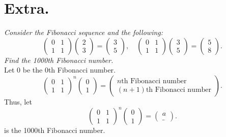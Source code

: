 \documentclass[12pt]{article}
\begin{document}
\section{Extra.}
\textit{Consider the Fibonacci sequence and the following:}
\begin{equation*}
	\begin{pmatrix} 0 & 1 \\ 1 & 1 \end{pmatrix}
	\begin{pmatrix} 2 \\ 3 \end{pmatrix}
	=
	\begin{pmatrix} 3 \\ 5 \end{pmatrix}
	, \quad
	\begin{pmatrix} 0 & 1 \\ 1 & 1 \end{pmatrix}
	\begin{pmatrix} 3 \\ 5 \end{pmatrix}
	=
	\begin{pmatrix} 5 \\ 8 \end{pmatrix}
	.
\end{equation*}
\textit{Find the 1000th Fibonacci number.} \\[\baselineskip]
Let $0$ be the $0$th Fibonacci number.
\begin{equation*}
	\begin{pmatrix} 0 & 1 \\ 1 & 1 \end{pmatrix}^n
	\begin{pmatrix} 0 \\ 1 \end{pmatrix}
	=
	\begin{pmatrix}
		n\text{th Fibonacci number} \\
		(n+1)\text{th Fibonacci number}
	\end{pmatrix}
	.
\end{equation*}
Thus, let
\begin{equation*}
	\begin{pmatrix} 0 & 1 \\ 1 & 1 \end{pmatrix}^n
	\begin{pmatrix} 0 \\ 1 \end{pmatrix}
	=
	\begin{pmatrix}
		a \\
		\_
	\end{pmatrix}
	.
\end{equation*}
 is the 1000th Fibonacci number.
\end{document}
